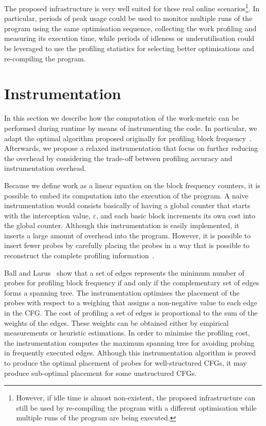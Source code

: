\documentclass[sigplan,10pt]{acmart}
\theoremstyle{definition}
\begin{document}
The proposed infrastructure is very well suited for these real online scenarios\footnote{
However, if idle time is almost non-existent, the proposed infrastructure can still be used by re-compiling the program with a different optimisation while multiple runs of the program are being executed.}.
In particular, periods of peak usage could be used to monitor multiple runs of the program using the same optimisation sequence, collecting the work profiling and measuring its execution time,
while periods of idleness or underutilisation could be leveraged to use the profiling statistics for selecting better optimisations and re-compiling the program.

\section{Instrumentation}

In this section we describe how the computation of the work-metric can be performed during runtime by means of instrumenting the code.
In particular, we adapt the optimal algorithm proposed originally for profiling block frequency~\cite{knuth73,ball94}.
Afterwards, we propose a relaxed instrumentation that focus on further reducing the overhead by considering the trade-off between profiling accuracy and instrumentation overhead.

Because we define work as a linear equation on the block frequency counters, it is possible to embed its computation into the execution of the program.
A naive instrumentation would consists basically of having a global counter that starts with the interception value, $\varepsilon$, and each basic block increments its own cost into the global counter.
Although this instrumentation is easily implemented, it inserts a large amount of overhead into the program.
However, it is possible to insert fewer probes by carefully placing the probes in a way that is possible to reconstruct the complete profiling information~\cite{knuth73,ball94}.

Ball and Larus~\cite{ball94} show that a set of edges represents the minimum number of probes for profiling block frequency if and only if the complementary set of edges forms a spanning tree.
The instrumentation optimises the placement of the probes with respect to a weighing that assigns a non-negative value to each edge in the CFG.
The cost of profiling a set of edges is proportional to the sum of the weights of the edges.
These weights can be obtained either by empirical measurements or heuristic estimations.
In order to minimise the profiling cost, the instrumentation computes the maximum spanning tree for avoiding probing in frequently executed edges.
Although this instrumentation algorithm is proved to produce the optimal placement of probes for well-structured CFGs, it may produce sub-optimal placement for some unstructured CFGs.
\end{document}
